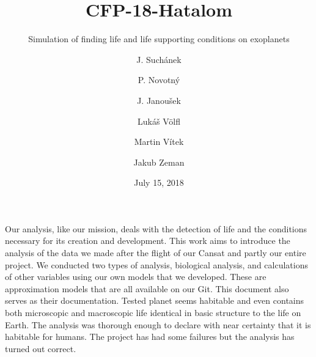 \documentclass{cfp}
\begin{document}
 


   \title{CFP-18-Hatalom}

   \subtitle{ Simulation of finding life and life supporting conditions on exoplanets }

   \author{J. Suchánek
		  \and          
          P. Novotný
   		  \and
   		  J. Janoušek
   		  \and
   		  Lukáš Völfl
   		  \and
   		  Martin Vítek
   		  \and
   		  Jakub Zeman
          }
          

   \date{July 15, 2018}

 
  \abstract
   {Our analysis, like our mission, deals with the detection of life and the conditions necessary for its creation and development.}
   {This work aims to introduce the analysis of the data we made after the flight of our Cansat and partly our entire project.}
   {We conducted two types of analysis, biological analysis, and calculations of other variables using our own models that we developed. These are approximation models that are all available on our Git. This document also serves as their documentation.}
   {Tested planet seems habitable and even contains both microscopic and macroscopic life identical in basic structure to the life on Earth.}
   {The analysis was thorough enough to declare with near certainty that it is habitable for humans. The project has had some failures but the analysis has turned out correct.}
\end{document}
